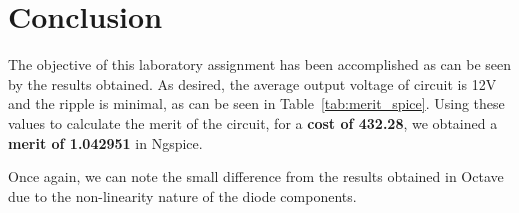\section{Conclusion}
\label{sec:conclusion}

\tab The objective of this laboratory assignment has been accomplished as can be seen by the results obtained. As desired, the average output voltage of circuit is 12V and the ripple is minimal, as can be seen in Table~\ref{tab:merit_spice}. Using these values to calculate the merit of the circuit, for a \textbf{cost of 432.28}, we obtained a \textbf{merit of 1.042951 }in Ngspice.

Once again, we can note the small difference from the results obtained in Octave due to the non-linearity nature of the diode components.

